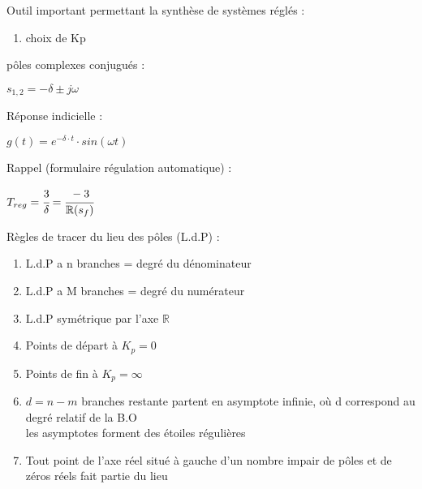 
\hformbar
{}

\footnotesize Outil important permettant la synthèse de systèmes réglés : 
\begin{enumerate}
 \item choix de Kp
\end{enumerate}

pôles complexes conjugués :

{\hfill $s_{1,2} = -\delta \pm j\omega $\hfill}

Réponse indicielle :

{\hfill $g(t) = e^{-\delta \cdot t} \cdot sin(\omega t) $\hfill}

Rappel (formulaire régulation automatique) : 

{\hfill $T_{reg} = \cfrac{3}{\delta} = \cfrac{-3}{\mathbb{R}(s_f)}$\hfill}\vspace{3mm}

Règles de tracer du lieu des pôles (L.d.P) :
\begin{enumerate}
    \item L.d.P a n branches = degré du dénominateur 
    \item L.d.P a M branches = degré du numérateur
    \item L.d.P symétrique par l'axe $\mathbb{R}$
    \item Points de départ à $K_p = 0$
    \item Points de fin à $K_p = \infty$
    \item $d = n-m$ branches restante partent en asymptote infinie, où d correspond au degré relatif de la B.O\\ les asymptotes forment des étoiles régulières
    \item Tout point de l'axe réel situé à gauche d'un nombre impair de pôles et de zéros réels fait partie du lieu
\end{enumerate}



\hformbar

